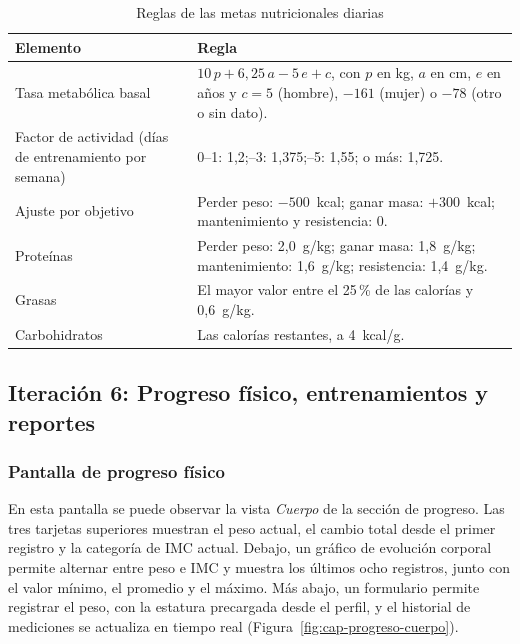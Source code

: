 \begin{table}[H]
\centering
\caption{Reglas de las metas nutricionales diarias}
\label{tab:reglas-metas}
\small
\begin{tabularx}{\textwidth}{|L{4.2cm}|Y|}
\hline
{} \textbf{Elemento} & \textbf{Regla} \\
\hline
Tasa metabólica basal & $10\,p + 6{,}25\,a - 5\,e + c$, con $p$ en kg, $a$ en
cm, $e$ en años y $c = 5$ (hombre), $-161$ (mujer) o $-78$ (otro o sin
dato). \\ \hline
Factor de actividad (días de entrenamiento por semana) & 0--1: 1,2;--3:
1,375;--5: 1,55; o más: 1,725. \\ \hline
Ajuste por objetivo & Perder peso: $-500$~kcal; ganar masa: $+300$~kcal;
mantenimiento y resistencia: 0. \\ \hline
Proteínas & Perder peso: 2,0~g/kg; ganar masa: 1,8~g/kg; mantenimiento: 1,6~g/kg;
resistencia: 1,4~g/kg. \\ \hline
Grasas & El mayor valor entre el 25\,\% de las calorías y 0,6~g/kg. \\ \hline
Carbohidratos & Las calorías restantes, a 4~kcal/g. \\
\hline
\end{tabularx}
\end{table}

\subsection{Iteración 6: Progreso físico, entrenamientos y reportes}
\label{subsec:it6}

\subsubsection{Pantalla de progreso físico}

En esta pantalla se puede observar la vista \emph{Cuerpo} de la sección de
progreso. Las tres tarjetas superiores muestran el peso actual, el cambio
total desde el primer registro y la categoría de IMC actual. Debajo, un gráfico
de evolución corporal permite alternar entre peso e IMC y muestra los últimos
ocho registros, junto con el valor mínimo, el promedio y el máximo. Más abajo,
un formulario permite registrar el peso, con la estatura precargada desde el
perfil, y el historial de mediciones se actualiza en tiempo real
(Figura~\ref{fig:cap-progreso-cuerpo}).

